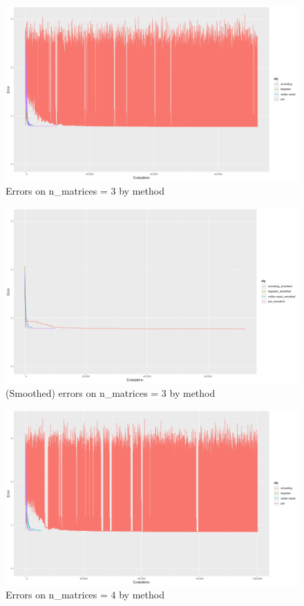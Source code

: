 \begin{figure}[!htb]
\centering
\includegraphics[width=\textwidth]{figures/n_3}
\decoRule
\caption[n=3]{Errors on n\_matrices = 3 by method}
\label{fig:n_3}
\end{figure}

\begin{figure}[!htb]
\centering
\includegraphics[width=\textwidth]{figures/n_3_smoothed}
\decoRule
\caption[n=3 (smoothed)]{(Smoothed) errors on n\_matrices = 3 by method}
\label{fig:n_3_smoothed}
\end{figure}

\begin{figure}[!htb]
\centering
\includegraphics[width=\textwidth]{figures/n_4}
\decoRule
\caption[n=4]{Errors on n\_matrices = 4 by method}
\label{fig:n_4}
\end{figure}

